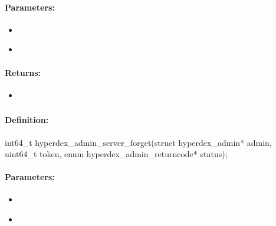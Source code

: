 \paragraph{Parameters:}
\begin{itemize}[noitemsep]
\item {}\\

\item {}\\

\end{itemize}

\paragraph{Returns:}
\begin{itemize}[noitemsep]
\item {}\\

\end{itemize}

\pagebreak
\subsubsection{}
\label{api:c:server_forget}


\paragraph{Definition:}
\begin{ccode}
int64_t hyperdex_admin_server_forget(struct hyperdex_admin* admin,
        uint64_t token,
        enum hyperdex_admin_returncode* status);
\end{ccode}

\paragraph{Parameters:}
\begin{itemize}[noitemsep]
\item {}\\

\item {}\\

\end{itemize}

